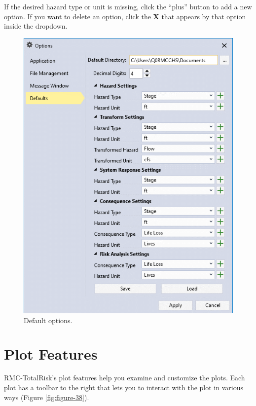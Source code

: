 \documentclass[
]{book}
\begin{document}
If the desired hazard type or unit is missing, click the ``plus'' button to add a new option. If you want to delete an option, click the \textbf{X} that appears by that option inside the dropdown.

\begin{figure}

{\centering \includegraphics{images/figure37} 

}

\caption{Default options.}\label{fig:figure-37}
\end{figure}

\hypertarget{plot-features}{%
\section{Plot Features}\label{plot-features}}

RMC-TotalRisk's plot features help you examine and customize the plots. Each plot has a toolbar to the right that lets you to interact with the plot in various ways (Figure \ref{fig:figure-38}).
\end{document}
